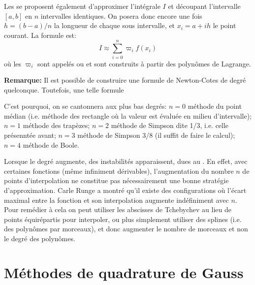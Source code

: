 Les  se proposent également d'approximer
l'intégrale $I$ et découpant l'intervalle $[a,b]$ en $n$ intervalles identiques.
On posera donc encore une fois $h=(b-a)/n$ la longueur de chaque sous intervalle, 
et $x_i=a+ih$ le point courant.
La formule est:
\begin{equation} I\approx \sum_{i=0}^n \varpi_i f(x_i) \end{equation}
où les $\varpi_i$ sont appelés  ou  et sont construits à partir des polynômes de Lagrange.

\medskip
{}

\medskip
\textbf{Remarque:}
Il est possible de construire une formule de Newton-Cotes de degré quelconque.
Toutefois, une telle formule 

C'est pourquoi, on se cantonnera aux plus bas degrés:
$n=0$ méthode du point médian (i.e. méthode des rectangle où la valeur est
évaluée en milieu d'intervalle); 
$n=1$ méthode des trapèzes;
$n=2$ méthode de Simpson dite 1/3, i.e. celle présenntée avant;
$n=3$ méthode de Simpson 3/8 (il suffit de faire le calcul);
$n=4$ méthode de Boole.

Lorsque le degré augmente, des instabilités apparaissent, dues au
.
En effet, avec certaines fonctions (même infiniment dérivables), l'augmentation 
du nombre $n$ de points d'interpolation ne constitue pas nécessairement une bonne 
stratégie d'approximation.
Carle Runge a montré qu'il existe des configurations où l'écart maximal entre la fonction 
et son interpolation augmente indéfiniment avec $n$.
Pour remédier à cela on peut utiliser les abscisses de Tchebychev 
au lieu de points équirépartis pour interpoler, ou plus simplement utiliser des splines (i.e. des polynômes 
par morceaux), et donc augmenter le nombre de morceaux et non le degré des polynômes.








\medskip
\section{Méthodes de quadrature de Gauss}

